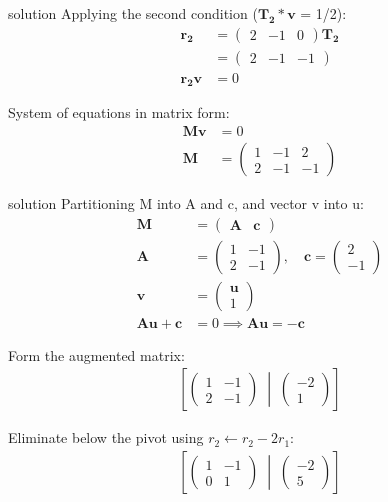 \documentclass{beamer}
\numberwithin{equation}{section}
\theoremstyle{remark}
\newcommand{\myvec}[1]{\ensuremath{\begin{pmatrix}#1\end{pmatrix}}}
\let\vec\mathbf
\begin{document}
\begin{frame}{solution}
Applying the second condition ($\vec{T_2}*\vec{v}$ = 1/2):
\begin{align}
\vec{r_2} &= \myvec{2 & -1 & 0} \vec{\vec{T_2}} \\
    &= \myvec{2 & -1 & -1} \\
\vec{r_2} \vec{v} &= 0
\end{align}

System of equations in matrix form:
\begin{align}
\vec{M} \vec{v} &= 0 \\
\vec{M} &= \myvec{1 & -1 & 2 \\ 2 & -1 & -1}
\end{align}


\end{frame}
\begin{frame}{solution}
Partitioning M into A and c, and vector v into u:
\begin{align}
\vec{M} &= \myvec{\vec{A} & \vec{c}} \\
\vec{A} &= \myvec{1 & -1 \\ 2 & -1}, \quad \vec{c} = \myvec{2 \\ -1} \\
\vec{v} &= \myvec{\vec{u} \\ 1} \\
\vec{A} \vec{u} + \vec{c} &= 0 \implies \vec{A} \vec{u} = -\vec{c}
\end{align}



Form the augmented matrix:
\begin{align}
\left[\myvec{1 & -1 \\ 2 & -1} \;\middle|\; \myvec{-2 \\ 1}\right]
\end{align}

Eliminate below the pivot using 
\(r_2 \leftarrow r_2 - 2 r_1\):
\begin{align}
\left[\myvec{1 & -1 \\ 0 & 1} \;\middle|\; \myvec{-2 \\ 5}\right]
\end{align}
\end{frame}
\end{document}
